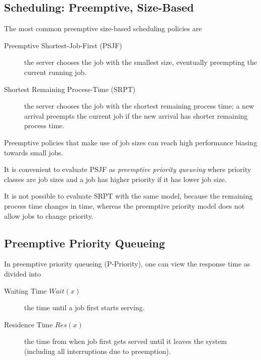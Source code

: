 \subsection{Scheduling: Preemptive, Size-Based}
\label{sec:Scheduling-Preemptive-Size-Based}

The most common preemptive size-based scheduling policies are

\begin{description}
	
	\item [Preemptive Shortest-Job-First (PSJF)] the server chooses the job with the smallest size, eventually preempting the current running job.
	
	\item [Shortest Remaining Process-Time (SRPT)] the server chooses the job with the shortest remaining process time; a new arrival preempts the current job if the new arrival has shorter remaining process time.
	
\end{description}

Preemptive policies that make use of job sizes can reach high performance biasing towards small jobs.

It is convenient to evaluate PSJF as \textit{preemptive priority queueing} where priority classes are job sizes and a job has higher priority if it has lower job size.

It is not possible to evaluate SRPT with the same model, because the remaining process time changes in time, whereas the preemptive priority model does not allow jobs to change priority.




\subsection{Preemptive Priority Queueing}
\label{sec:P-Priority}

In preemptive priority queueing (P-Priority), one can view the response time as divided into

\begin{description}

	\item [Waiting Time $Wait(x)$] the time until a job first starts serving.
	
	\item [Residence Time $Res(x)$] the time from when job first gets served until it leaves the system (including all interruptions due to preemption).

\end{description}

